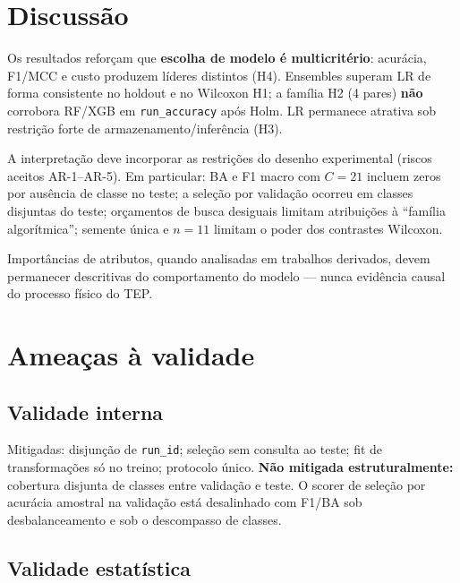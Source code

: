 \documentclass[11pt,a4paper]{article}
\begin{document}
\section{Discussão}
\label{sec:discussao}

Os resultados reforçam que \textbf{escolha de modelo é multicritério}: acurácia,
F1/MCC e custo produzem líderes distintos (H4). Ensembles superam LR de forma
consistente no holdout e no Wilcoxon H1; a família H2 (4 pares) \textbf{não}
corrobora RF/XGB em \texttt{run\_accuracy} após Holm. LR permanece atrativa sob
restrição forte de armazenamento/inferência (H3).

A interpretação deve incorporar as restrições do desenho experimental
(riscos aceitos AR-1--AR-5). Em particular: BA e F1 macro com $C{=}21$ incluem
zeros por ausência de classe no teste; a seleção por validação ocorreu em
classes disjuntas do teste; orçamentos de busca desiguais limitam atribuições
à ``família algorítmica''; semente única e $n{=}11$ limitam o poder dos
contrastes Wilcoxon.

Importâncias de atributos, quando analisadas em trabalhos derivados, devem
permanecer descritivas do comportamento do modelo --- nunca evidência causal do
processo físico do TEP.

\section{Ameaças à validade}
\label{sec:ameacas}

\subsection{Validade interna}

Mitigadas: disjunção de \texttt{run\_id}; seleção sem consulta ao teste; fit de
transformações só no treino; protocolo único. \textbf{Não mitigada
estruturalmente:} cobertura disjunta de classes entre validação e teste. O
scorer de seleção por acurácia amostral na validação está desalinhado com F1/BA
sob desbalanceamento e sob o descompasso de classes.

\subsection{Validade estatística}
\end{document}
